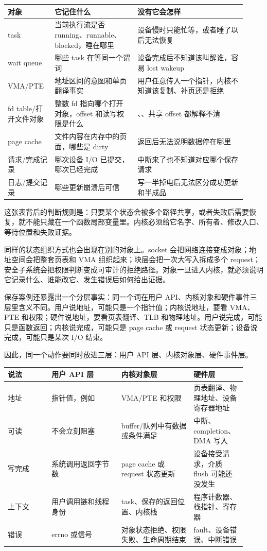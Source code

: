 \begin{longtable}{|L{0.18\linewidth}|L{0.32\linewidth}|L{0.42\linewidth}|}
\toprule
对象 & 它记住什么 & 没有它会怎样 \\
\midrule
task & 当前执行流是否 running、runnable、blocked，睡在哪里 & 设备慢时只能忙等，或者睡了以后无法恢复 \\\tablerowrule
wait queue & 哪些 task 在等同一个谓词 & 设备完成后不知道该叫醒谁，容易 lost wakeup \\\tablerowrule
VMA/PTE & 地址区间的意图和单页翻译事实 & 用户任意传入一个指针，内核不知道该复制、补页还是拒绝 \\\tablerowrule
fd table/打开文件对象 & 整数 fd 指向哪个打开对象，offset 和读写权限是什么 & 、、共享 offset 都解释不清 \\\tablerowrule
page cache & 文件内容在内存中的页面，哪些是 dirty &  返回后无法说明数据停在哪里 \\\tablerowrule
请求/完成记录 & 哪次设备 I/O 已提交，哪次已经完成 & 中断来了也不知道对应哪个保存请求 \\\tablerowrule
日志/提交记录 & 哪些更新崩溃后可信 & 写一半掉电后无法区分成功更新和半成品 \\
\bottomrule
\end{longtable}

这张表背后的判断规则是：只要某个状态会被多个路径共享，或者失败后需要恢复，就不能只藏在一个函数局部变量里。内核必须给它名字、所有者、修改入口、等待位置和失败证据。

同样的状态组织方式也会出现在别的对象上。socket 会把网络连接变成对象；地址空间会把整套页表和 VMA 组织起来；块层会把一次大写入拆成多个 request；安全子系统会把权限判断变成可审计的拒绝路径。对象一旦进入内核，就必须说明它记录什么、谁能改它、发生错误后如何给出证据。

保存案例还暴露出一个分层事实：同一个词在用户 API、内核对象和硬件事件三层里含义不同。用户说地址，可能只是一个指针值；内核说地址，要看 VMA、PTE 和权限；硬件说地址，要看页表翻译、TLB 和物理地址。用户说完成，可能只是函数返回；内核说完成，可能只是 page cache 或 request 状态更新；设备说完成，可能只是某次 I/O 结束。

因此，同一个动作要同时放进三层：用户 API 层、内核对象层、硬件事件层。

\begin{longtable}{|L{0.17\linewidth}|L{0.27\linewidth}|L{0.28\linewidth}|L{0.2\linewidth}|}
\toprule
说法 & 用户 API 层 & 内核对象层 & 硬件层 \\
\midrule
地址 & 指针值，例如  & VMA/PTE 和权限 & 页表翻译、物理地址、设备寄存器地址 \\\tablerowrule
可读 &  不会立刻阻塞 & buffer/队列中有数据或条件满足 & 中断、completion、DMA 写入 \\\tablerowrule
写完成 & 系统调用返回字节数 & page cache 或 request 状态更新 & 设备接受请求，介质 flush 可能还没发生 \\\tablerowrule
上下文 & 用户调用链和线程身份 & task、保存的返回位置、内核栈 & 程序计数器、栈指针、寄存器 \\\tablerowrule
错误 & errno 或信号 & 对象状态拒绝、权限失败、生命周期结束 & fault、设备错误、中断错误 \\
\bottomrule
\end{longtable}

